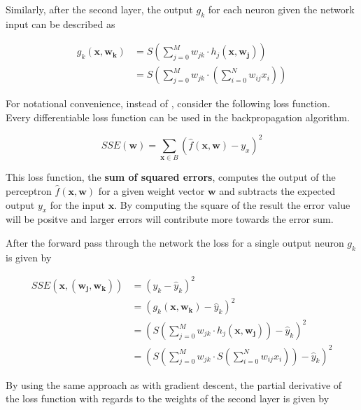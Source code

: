 Similarly, after the second layer, the output $g_k$ for each neuron given the network input can be described as 

\begin{equation}
    \begin{split}
        g_k(\bm{x}, \bm{w_k}) 
        &= S\left(\sum_{j=0}^M w_{jk} \cdot h_j(\bm{x}, \bm{w_j})\right) \\
        &= S\left(\sum_{j=0}^M w_{jk} \cdot \left(\sum_{i=0}^N w_{ij} x_i\right)\right)
    \end{split}
\end{equation}

For notational convenience, instead of , consider the following loss function.
Every differentiable loss function can be used in the backpropagation algorithm.

\begin{equation}
    SSE(\bm{w}) = \sum_{\bm{x} \in B} (\hat{f}(\bm{x}, \bm{w}) - y_x)^2
\end{equation}

This loss function, the \textbf{sum of squared errors}, computes the output of the perceptron $\hat{f}(\bm{x}, \bm{w})$ for a given weight vector $\bm{w}$ and subtracts the expected output $y_x$ for the input $\bm{x}$.
By computing the square of the result the error value will be positve and larger errors will contribute more towards the error sum.


After the forward pass through the network the loss for a single output neuron $g_k$ is given by

\begin{equation}
    \begin{split}
        SSE(\bm{x}, (\bm{w_j}, \bm{w_k})) 
        &= (y_k - \hat{y}_{k})^2 \\
        &= (g_k(\bm{x},\bm{w_k}) - \hat{y}_{k})^2 \\
        &= \left(S \left(\sum_{j=0}^M w_{jk} \cdot h_j(\bm{x}, \bm{w_j})\right) - \hat{y}_{k}\right)^2 \\
        &=  \left( S\left(\sum_{j=0}^M w_{jk} \cdot S \left(\sum_{i=0}^N w_{ij} x_i\right)\right) - \hat{y}_{k}\right)^2
    \end{split}
\end{equation}

By using the same approach as with gradient descent, the partial derivative of the loss function with regards to the weights of the second layer is given by 

